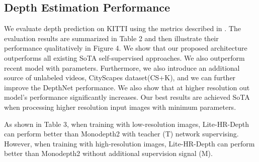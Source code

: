 \documentclass[letterpaper]{article} \usepackage{aaai21}  \usepackage{times}  \usepackage{helvet} \usepackage{courier}  \usepackage[hyphens]{url}  \usepackage{graphicx} \urlstyle{rm} \def\UrlFont{\rm}  \usepackage{natbib}  \usepackage{caption} \frenchspacing  \setlength{\pdfpagewidth}{8.5in}  \setlength{\pdfpageheight}{11in}  \usepackage{booktabs}
\begin{document}
\subsection{Depth Estimation Performance}
We evaluate depth prediction on KITTI using the metrics described in \cite{eigen2015predicting}. The evaluation results are summarized in Table 2 and then illustrate their performance qualitatively in Figure 4. 
We show that our proposed architecture outperforms all existing SoTA self-supervised approaches. We also outperform recent model \cite{packnet} with  parameters. Furthermore, we also introduce 
an additional source of unlabeled videos, CityScapes dataset(CS+K), and we can further improve the DepthNet performance. We also show that at higher resolution out model's performance significantly increases.
Our best results are achieved SoTA when processing higher resolution input images with minimum parameters. 

\noindent As shown in Table 3, when training with low-resolution images, Lite-HR-Depth can perform better than Monodepth2 with teacher (T) network supervising. However, when training with high-resolution images, 
Lite-HR-Depth can perform better than Monodepth2 without additional supervision signal (M).
\end{document}
